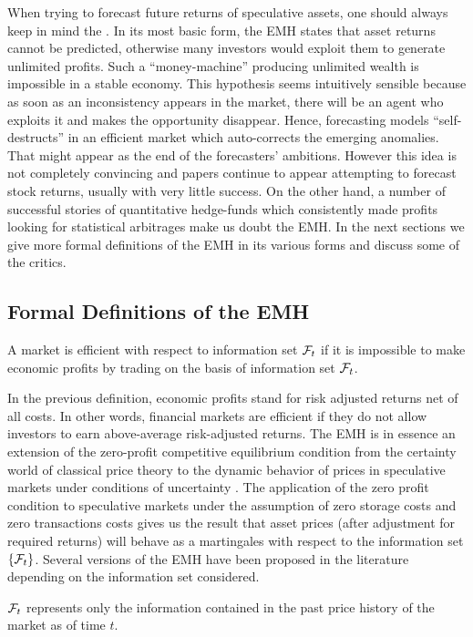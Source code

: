 When trying to forecast future returns of speculative assets, one should always keep in mind the  \cite{timmermann2004efficient}. In its most basic form, the \gls{EMH} states that asset returns cannot be predicted, otherwise many investors would exploit them to generate unlimited profits. Such a ``money-machine'' producing unlimited wealth is impossible in a stable economy. This hypothesis seems intuitively sensible because as soon as an inconsistency appears in the market, there will be an agent who exploits it and makes the opportunity disappear. Hence, forecasting models ``self-destructs'' in an efficient market which auto-corrects the emerging anomalies. That might appear as the end of the forecasters' ambitions. However this idea is not completely convincing and papers continue to appear attempting to forecast stock returns, usually with very little success. On the other hand, a number of successful stories of quantitative hedge-funds which consistently made profits looking for statistical arbitrages make us doubt the \gls{EMH}. In the next sections we give more formal definitions of the \gls{EMH} in its various forms and discuss some of the critics.

\subsection{Formal Definitions of the EMH}
\begin{definition}
	A market is efficient with respect to information set $\mathcal{F}_t$ if it is impossible to make economic profits by trading on the basis of information set $\mathcal{F}_t$.
\end{definition}
In the previous definition, economic profits stand for risk adjusted returns net of all costs. In other words, financial markets are efficient if they do not allow investors to earn above-average risk-adjusted returns. The \gls{EMH} is in essence an extension of the zero-profit competitive equilibrium condition from the certainty world of classical price theory to the dynamic behavior of prices in speculative markets under conditions of uncertainty \cite{jensen1978some}. The application of the zero profit condition to speculative markets under the assumption of zero storage costs and zero transactions costs gives us the result that asset prices (after adjustment for required returns) will behave as a martingales with respect to the information set $\{\mathcal{F}_t\}$. Several versions of the \gls{EMH} have been proposed in the literature depending on the information set considered.
\begin{definition}
	$\mathcal{F}_t$ represents only the information contained in the past price history of the market as of time $t$. 
\end{definition}

